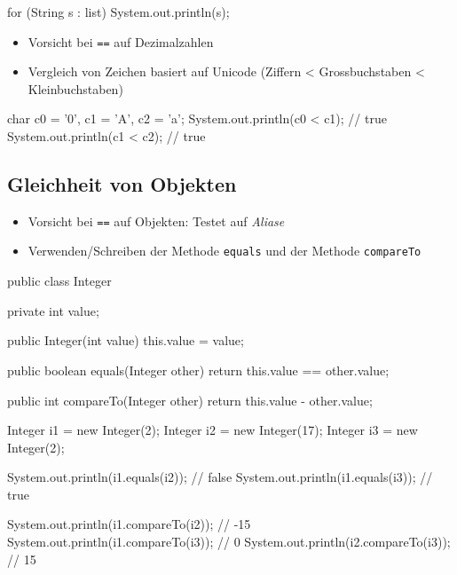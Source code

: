 \documentclass[a4paper,10pt, dvipsnames]{report}
\newcommand{\javaInLine}[1]{\texttt{#1}}
\begin{document}
\begin{javacodebox}
for (String s : list)
    System.out.println(s);
\end{javacodebox}

\begin{itemize}
    \item Vorsicht bei \javaInLine{==} auf Dezimalzahlen
\end{itemize}

\begin{javacodebox}
final double TOLERANCE = 0.00000001;
if (Math.abs(num1 - num2) < TOLERANCE) {
\end{javacodebox}

\begin{itemize}
    \item Vergleich von Zeichen basiert auf Unicode (Ziffern < Grossbuchstaben < Kleinbuchstaben)
\end{itemize}

\begin{javacodebox}
char c0 = '0', c1 = 'A', c2 = 'a';
System.out.println(c0 < c1); // true
System.out.println(c1 < c2); // true
\end{javacodebox}

\subsection{Gleichheit von Objekten}

\begin{itemize}
    \item Vorsicht bei \javaInLine{==} auf Objekten: Testet auf \textit{Aliase}
    \item Verwenden/Schreiben der Methode \javaInLine{equals} und der Methode \javaInLine{compareTo}
\end{itemize}

\begin{javacodebox}
public class Integer {

    private int value;

    public Integer(int value) {
    this.value = value;
    }

    public boolean equals(Integer other) {
    return this.value == other.value;
    }

    public int compareTo(Integer other) {
    return this.value - other.value;
    }
}
\end{javacodebox}

\begin{javacodebox}
Integer i1 = new Integer(2);
Integer i2 = new Integer(17);
Integer i3 = new Integer(2);

System.out.println(i1.equals(i2)); // false
System.out.println(i1.equals(i3)); // true

System.out.println(i1.compareTo(i2)); // -15
System.out.println(i1.compareTo(i3)); // 0
System.out.println(i2.compareTo(i3)); // 15
\end{javacodebox}
\end{document}
